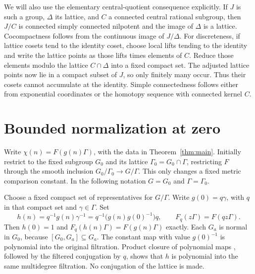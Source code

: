 \documentclass[11pt]{article}
\begin{document}
We will also use the elementary central-quotient consequence explicitly.
If $J$ is such a group, $\Delta$ its lattice, and $C$ a connected central
rational subgroup, then $J/C$ is connected simply connected nilpotent and the
image of $\Delta$ is a lattice. Cocompactness follows from the continuous image
of $J/\Delta$. For discreteness, if lattice cosets tend to the identity coset,
choose local lifts tending to the identity and write the lattice points as
those lifts times elements of $C$. Reduce those elements modulo the lattice
$C\cap\Delta$ into a fixed compact set. The adjusted lattice points now lie
in a compact subset of $J$, so only finitely many occur. Thus their cosets
cannot accumulate at the identity. Simple connectedness follows either from
exponential coordinates or the homotopy sequence with connected kernel $C$.

\section{Bounded normalization at zero}

Write $\chi(n)=F(g(n)\Gamma)$, with the data in
Theorem~\ref{thm:main}. Initially restrict to the fixed subgroup $G_0$ and its
lattice $\Gamma_0=G_0\cap\Gamma$, restricting $F$ through the smooth inclusion
$G_0/\Gamma_0\longrightarrow G/\Gamma$. This only changes a fixed metric
comparison constant. In the following notation $G=G_0$ and $\Gamma=\Gamma_0$.

Choose a fixed compact set of representatives for $G/\Gamma$. Write
$g(0)=q\gamma$, with $q$ in that compact set and $\gamma\in\Gamma$. Set
\begin{equation}\label{eq:normalize}
 h(n)=q^{-1}g(n)\gamma^{-1}
     =q^{-1}\bigl(g(n)g(0)^{-1}\bigr)q,
 \qquad F_q(z\Gamma)=F(qz\Gamma).
\end{equation}
Then $h(0)=1$ and $F_q(h(n)\Gamma)=F(g(n)\Gamma)$ exactly.
Each $G_a$ is normal in $G_0$, because $[G_0,G_a]\subseteq G_a$.
The constant map with value $g(0)^{-1}$ is polynomial into the original
filtration. Product closure of polynomial maps
\cite[Corollary B.4]{GTZ}, followed by the filtered conjugation by $q$, shows
that $h$ is polynomial into the same multidegree filtration. No conjugation
of the lattice is made.
\end{document}
